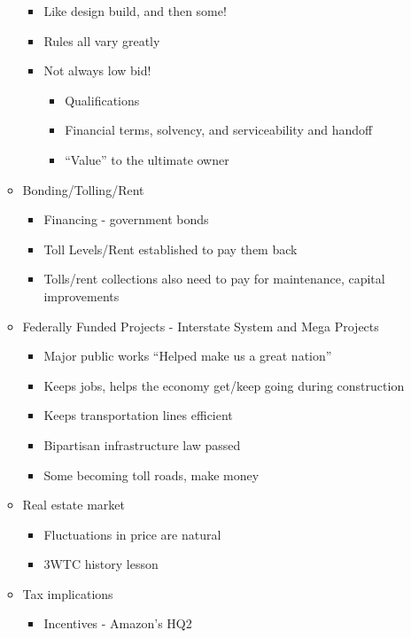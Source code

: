 \documentclass{article}
\begin{document}
\begin{itemize}
\begin{itemize}
        \begin{itemize}
            \item Like design build, and then some!
            \item Rules all vary greatly
            \item Not always low bid!
            \begin{itemize}
                \item Qualifications
                \item Financial terms, solvency, and serviceability and handoff
                \item ``Value'' to the ultimate owner
            \end{itemize}
        \end{itemize}
        \item Bonding/Tolling/Rent
        \begin{itemize}
            \item Financing - government bonds
            \item Toll Levels/Rent established to pay them back
            \item Tolls/rent collections also need to pay for maintenance, capital improvements
        \end{itemize}
        \item Federally Funded Projects - Interstate System and Mega Projects
        \begin{itemize}
            \item Major public works ``Helped make us a great nation''
            \item Keeps jobs, helps the economy get/keep going during construction
            \item Keeps transportation lines efficient
            \item Bipartisan infrastructure law passed
            \item Some becoming toll roads, make money
        \end{itemize}
        \item Real estate market
        \begin{itemize}
            \item Fluctuations in price are natural
            \item 3WTC history lesson
        \end{itemize}
        \item Tax implications
        \begin{itemize}
            \item Incentives - Amazon's HQ2

\end{itemize}
\end{itemize}
\end{itemize}
\end{document}
